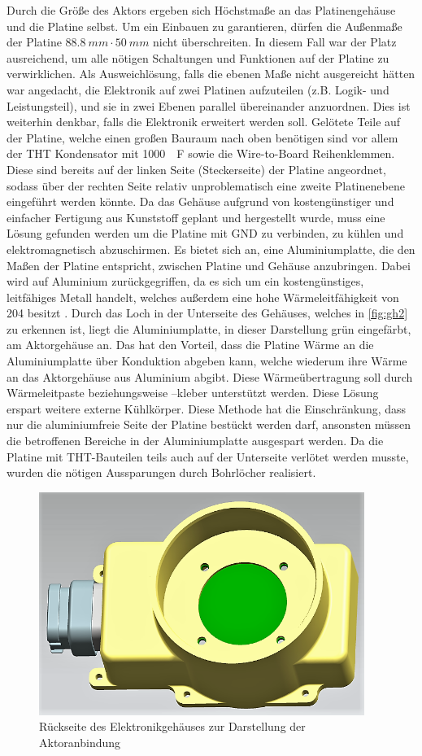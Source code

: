 Durch die Größe des Aktors ergeben sich Höchstmaße an das Platinengehäuse und die Platine selbst. Um ein Einbauen zu garantieren, dürfen die Außenmaße der Platine $\SI{88,8}{mm} \cdot \SI{50}{mm}$ nicht überschreiten. In diesem Fall war der Platz ausreichend, um alle nötigen Schaltungen und Funktionen auf der Platine zu verwirklichen. Als Ausweichlösung, falls die ebenen Maße nicht ausgereicht hätten war angedacht, die Elektronik auf zwei Platinen aufzuteilen (z.B. Logik- und Leistungsteil), und sie in zwei Ebenen parallel übereinander anzuordnen. Dies ist weiterhin denkbar, falls die Elektronik erweitert werden soll. Gelötete Teile auf der Platine, welche einen großen Bauraum nach oben benötigen sind vor allem der THT Kondensator mit \SI{1000}{\mu F} sowie die Wire-to-Board Reihenklemmen. Diese sind bereits auf der linken Seite (Steckerseite) der Platine angeordnet, sodass über der rechten Seite relativ unproblematisch eine zweite Platinenebene eingeführt werden könnte.
Da das Gehäuse aufgrund von kostengünstiger und einfacher Fertigung aus Kunststoff geplant und hergestellt wurde, muss eine Lösung gefunden werden um die Platine mit GND zu verbinden, zu kühlen und elektromagnetisch abzuschirmen. Es bietet sich an, eine Aluminiumplatte, die den Maßen der Platine entspricht, zwischen Platine und Gehäuse anzubringen. Dabei wird auf Aluminium zurückgegriffen, da es sich um ein kostengünstiges, leitfähiges Metall handelt, welches außerdem eine hohe Wärmeleitfähigkeit von \SI{204}{} besitzt \cite[S.4]{wuerth}. 
Durch das Loch in der Unterseite des Gehäuses, welches in \autoref{fig:gh2} zu erkennen ist, liegt die Aluminiumplatte, in dieser Darstellung grün eingefärbt, am Aktorgehäuse an. Das hat den Vorteil, dass die Platine Wärme an die Aluminiumplatte über Konduktion abgeben kann, welche wiederum ihre Wärme an das Aktorgehäuse aus Aluminium abgibt. Diese Wärmeübertragung soll durch Wärmeleitpaste beziehungsweise –kleber unterstützt werden. Diese Lösung erspart weitere externe Kühlkörper. Diese Methode hat die Einschränkung, dass nur die aluminiumfreie Seite der Platine bestückt werden darf, ansonsten müssen die betroffenen Bereiche in der Aluminiumplatte ausgespart werden. Da die Platine mit THT-Bauteilen teils auch auf der Unterseite verlötet werden musste, wurden die nötigen Aussparungen durch Bohrlöcher realisiert. 
\begin{figure}[H]%
\centering
\includegraphics[width=300pt]{./Bilder/Elektronik_Gehauese}%
\caption{Rückseite des Elektronikgehäuses zur Darstellung der Aktoranbindung}%
\label{fig:gh2}%
\end{figure}
